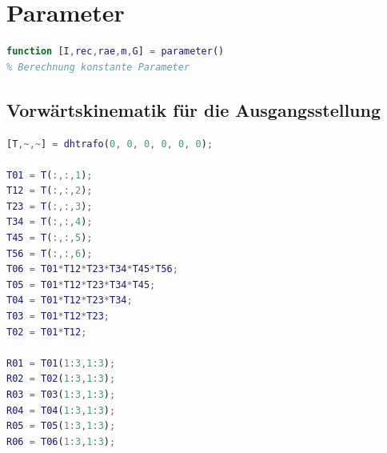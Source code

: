 \label{add:systemparameter}
%
%
%
\setcounter{section}{1}
\section{Parameter}
\begin{lstlisting}[language=Matlab, numbers=none]
function [I,rec,rae,m,G] = parameter()
% Berechnung konstante Parameter
\end{lstlisting}
%
\subsection{Vorwärtskinematik für die Ausgangsstellung}
%
\begin{lstlisting}[language=Matlab, numbers=none]
[T,~,~] = dhtrafo(0, 0, 0, 0, 0, 0);

T01 = T(:,:,1);
T12 = T(:,:,2);
T23 = T(:,:,3);
T34 = T(:,:,4);
T45 = T(:,:,5);
T56 = T(:,:,6);
T06 = T01*T12*T23*T34*T45*T56;
T05 = T01*T12*T23*T34*T45;
T04 = T01*T12*T23*T34;
T03 = T01*T12*T23;
T02 = T01*T12;

R01 = T01(1:3,1:3);
R02 = T02(1:3,1:3);
R03 = T03(1:3,1:3);
R04 = T04(1:3,1:3);
R05 = T05(1:3,1:3);
R06 = T06(1:3,1:3);
\end{lstlisting}
%
